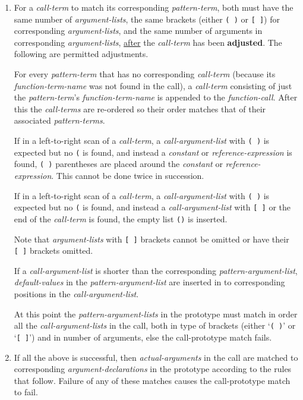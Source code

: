 \documentclass[12pt]{article}
\newcommand{\key}[1]{{\rm \bfseries #1}}
\begin{document}
\begin{enumerate}
\item For a {\em call-term} to match its corresponding {\em pattern-term},
both must have the same number of {\em argument-lists}, the same
brackets (either {\tt (~)} or {\tt [~]}) for corresponding
{\em argument-lists}, and the same number of
arguments in corresponding {\em argument-lists}, \underline{after}
the {\em call-term} has been \key{adjusted}.  The following are
permitted adjustments.

For every {\em pattern-term} that has no corresponding {\em call-term}
(because its {\em function-term-name} was not found in the call),
a {\em call-term} consisting of just the {\em pattern-term}'s
{\em function-term-name} is appended to the {\em function-call}.
After this the {\em call-terms} are re-ordered so their order
matches that of their associated {\em pattern-terms}.

If in a left-to-right scan of a {\em call-term},
a {\em call-argument-list} with {\tt (~)} is expected but no {\tt (}
is found, and instead a {\em constant} or {\em reference-expression}
is found, {\tt (~)} parentheses are placed around the
{\em constant} or {\em reference-expression}.  This cannot be
done twice in succession.

If in a left-to-right scan of a {\em call-term},
a {\em call-argument-list} with {\tt (~)} is expected but no {\tt (}
is found, and instead a {\em call-argument-list} with {\tt [~]}
or the end of the {\em call-term} is found,
the empty list {\tt ()} is inserted.

Note that {\em argument-lists} with {\tt [~]} brackets cannot
be omitted or have their {\tt [~]} brackets omitted.

If a {\em call-argument-list} is shorter than the
corresponding {\em pattern-argument-list}, {\em default-values}
in the {\em pattern-argument-list} are inserted in to corresponding
positions in the {\em call-argument-list}.

At this point the {\em pattern-argument-lists} in the prototype
must match in order all the {\em call-argument-lists} in the call, both in
type of brackets (either `{\tt (~)}' or `{\tt [~]}') and in number
of arguments, else the call-prototype match fails.

\item If all the above is successful, then {\em actual-arguments}
in the call are matched to corresponding {\em argument-declarations}
in the prototype according to the rules that follow.
Failure of any of these matches causes
the call-prototype match to fail.


\end{enumerate}
\end{document}
